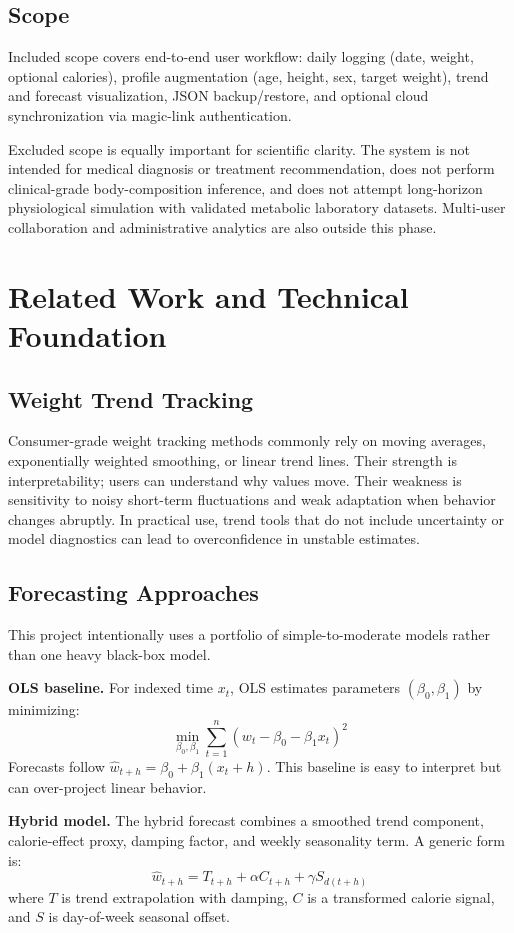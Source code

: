 \documentclass[12pt,a4paper]{report}
\begin{document}
\section{Scope}
Included scope covers end-to-end user workflow: daily logging (date, weight, optional calories), profile augmentation (age, height, sex, target weight), trend and forecast visualization, JSON backup/restore, and optional cloud synchronization via magic-link authentication.

Excluded scope is equally important for scientific clarity. The system is not intended for medical diagnosis or treatment recommendation, does not perform clinical-grade body-composition inference, and does not attempt long-horizon physiological simulation with validated metabolic laboratory datasets. Multi-user collaboration and administrative analytics are also outside this phase.

\chapter{Related Work and Technical Foundation}
\section{Weight Trend Tracking}
Consumer-grade weight tracking methods commonly rely on moving averages, exponentially weighted smoothing, or linear trend lines. Their strength is interpretability; users can understand why values move. Their weakness is sensitivity to noisy short-term fluctuations and weak adaptation when behavior changes abruptly. In practical use, trend tools that do not include uncertainty or model diagnostics can lead to overconfidence in unstable estimates.

\section{Forecasting Approaches}
This project intentionally uses a portfolio of simple-to-moderate models rather than one heavy black-box model.

\textbf{OLS baseline.} For indexed time $x_t$, OLS estimates parameters $(\beta_0,\beta_1)$ by minimizing:
\[
\min_{\beta_0,\beta_1} \sum_{t=1}^{n} (w_t - \beta_0 - \beta_1 x_t)^2
\]
Forecasts follow $\hat{w}_{t+h}=\beta_0+\beta_1(x_t+h)$. This baseline is easy to interpret but can over-project linear behavior.

\textbf{Hybrid model.} The hybrid forecast combines a smoothed trend component, calorie-effect proxy, damping factor, and weekly seasonality term. A generic form is:
\[
\hat{w}_{t+h}=T_{t+h}+\alpha C_{t+h}+\gamma S_{d(t+h)}
\]
where $T$ is trend extrapolation with damping, $C$ is a transformed calorie signal, and $S$ is day-of-week seasonal offset.
\end{document}

